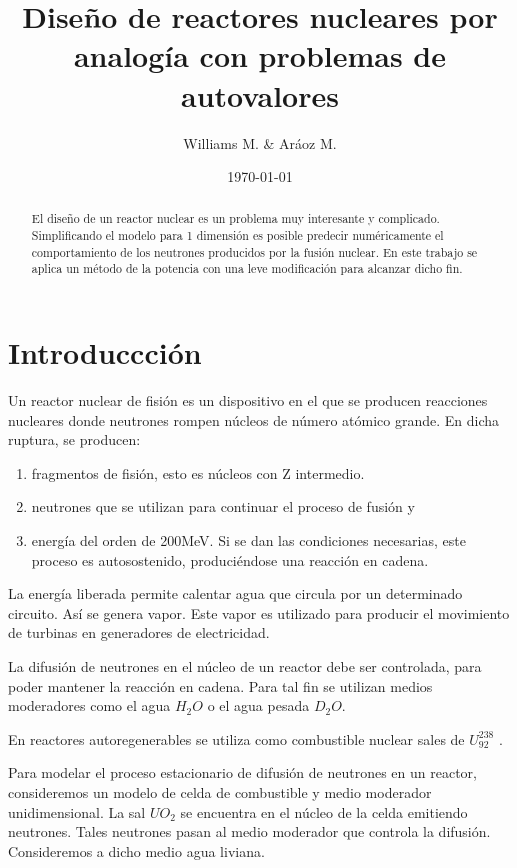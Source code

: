 \documentclass[11pt,a4paper]{emulateapj}
\begin{document}
\title{Diseño de reactores nucleares por analogía con problemas de autovalores}
\author{Williams M. \& Aráoz M.}
\date{\today}


\begin{abstract}
El diseño de un reactor nuclear es un problema muy interesante y complicado. Simplificando el
modelo para 1 dimensión es posible predecir numéricamente el comportamiento de los neutrones
producidos por la fusión nuclear. En este trabajo se aplica un método de la potencia con una 
leve modificación para alcanzar dicho fin.
\end{abstract}

\maketitle




\section{Introduccción}
\label{sec:introduccion}
Un reactor nuclear de fisión es un dispositivo en el que se producen reacciones nucleares
donde neutrones rompen núcleos de número atómico grande. En dicha ruptura, se
producen: 
\begin{enumerate}
	\item fragmentos de fisión, esto es núcleos con Z intermedio.
	\item neutrones que se utilizan para continuar el proceso de fusión y 
	\item energía del orden de 200MeV. Si se dan
las condiciones necesarias, este proceso es autosostenido, produciéndose una reacción en cadena.
\end{enumerate}
La energía liberada permite calentar agua que circula por un determinado circuito. Así
se genera vapor. Este vapor es utilizado para producir el movimiento de turbinas en
generadores de electricidad.

La difusión de neutrones en el núcleo de un reactor debe ser controlada, para poder mantener
la reacción en cadena. Para tal fin se utilizan medios moderadores como el agua $H_2O$
o el agua pesada $D_2O$.


En reactores autoregenerables se utiliza como combustible nuclear sales de $U^{238}_{92}$ .

Para modelar el proceso estacionario de difusión de neutrones en un reactor, consideremos
un modelo de celda de combustible y medio moderador unidimensional. La sal $UO_2$ se
encuentra en el núcleo de la celda emitiendo neutrones. Tales neutrones pasan al medio
moderador que controla la difusión. Consideremos a dicho medio agua liviana.
\end{document}
